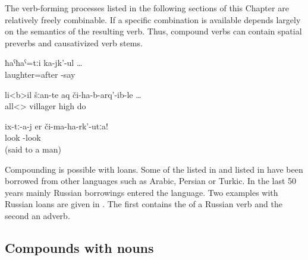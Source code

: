 The verb-forming processes listed in the following sections of this Chapter are relatively freely combinable. If a specific combination is available depends largely on the semantics of the resulting verb. Thus, compound verbs can contain spatial preverbs  and causativized verb stems.

\begin{exe}
	\ex	\label{ex:laughing about (me)}
	\gll	ħaˁħaˁ=tːi	ka-jk'-ul	\ldots\\
		laughter=after	-say\\
	\glt	{}

	\ex	\label{ex:all villagers were mobilized}
	\gll	li<b>il	šːan-te	aq	či-ha-b-arq'-ib-le	\ldots\\
		all<>	villager	high	do\\
	\glt	{}

	\ex	\label{ex:Do not look at them (the treesCOMPOUNDING}
	\gll	ix-tː-a-j	er	či-ma-ha-rk'-utːa!\\
			look	-look\\
	\glt	{} (said to a man)
\end{exe}

Compounding is possible with loans. Some of the  listed in  and  listed in  have been borrowed from other languages such as Arabic, Persian or Turkic. In the last 50 years mainly Russian borrowings entered the language. Two examples with Russian loans are given in . The first  contains the  of a Russian verb and the second an adverb.


\begin{exe}
	\ex	\label{ex:russianloancompounds}
	\begin{xlist}
		\ex	{} 
		\ex	{} 
	\end{xlist}
\end{exe}

\subsection{Compounds with nouns}
\label{ssec:compoundswithnouns}

